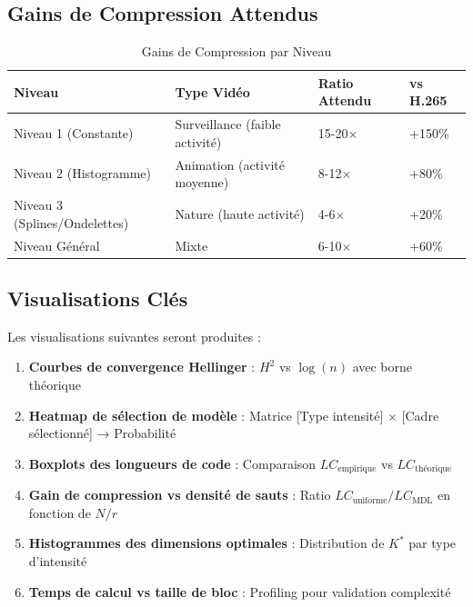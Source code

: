 \documentclass[12pt,a4paper]{article}
\begin{document}
	\subsection{Gains de Compression Attendus}
	\label{subsec:gains_attendus}
	
	\begin{table}[h]
		\centering
		\caption{Gains de Compression par Niveau}
		\label{tab:gains_compression}
		\begin{tabular}{@{}llll@{}}
			\toprule
			\textbf{Niveau} & \textbf{Type Vidéo} & \textbf{Ratio Attendu} & \textbf{vs H.265} \\
			\midrule
			Niveau 1 (Constante) & Surveillance (faible activité) & 15-20× & +150\% \\
			Niveau 2 (Histogramme) & Animation (activité moyenne) & 8-12× & +80\% \\
			Niveau 3 (Splines/Ondelettes) & Nature (haute activité) & 4-6× & +20\% \\
			Niveau Général & Mixte & 6-10× & +60\% \\
			\bottomrule
		\end{tabular}
	\end{table}
	
	\subsection{Visualisations Clés}
	\label{subsec:visualisations}
	
	Les visualisations suivantes seront produites :
	
	\begin{enumerate}
		\item \textbf{Courbes de convergence Hellinger} : $H^2$ vs $\log(n)$ avec borne théorique
		\item \textbf{Heatmap de sélection de modèle} : Matrice [Type intensité] × [Cadre sélectionné] → Probabilité
		\item \textbf{Boxplots des longueurs de code} : Comparaison $LC_{\text{empirique}}$ vs $LC_{\text{théorique}}$
		\item \textbf{Gain de compression vs densité de sauts} : Ratio $LC_{\text{uniforme}}/LC_{\text{MDL}}$ en fonction de $N/r$
		\item \textbf{Histogrammes des dimensions optimales} : Distribution de $K^*$ par type d'intensité
		\item \textbf{Temps de calcul vs taille de bloc} : Profiling pour validation complexité
	\end{enumerate}
	
\end{document}
